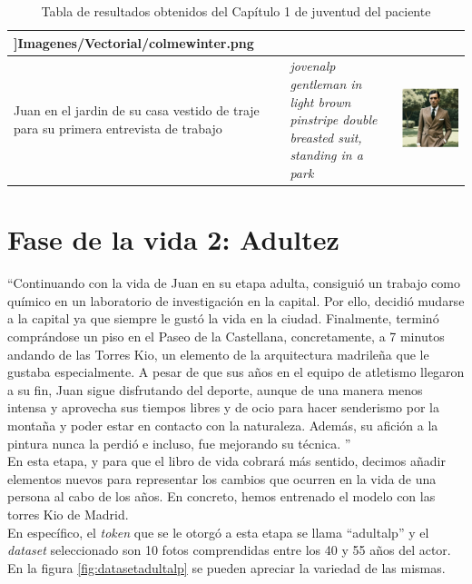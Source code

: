 \begin{table}
\begin{tabular}{>{\centering\arraybackslash}m{5cm} >{\arraybackslash}m{5cm}>{\arraybackslash}m{5cm}}
 		\textwidth]{Imagenes/Vectorial/colmewinter.png}\\
 		\hline
 		Juan en el jardin de su casa vestido de traje para su primera entrevista de trabajo & \textit{jovenalp gentleman in light brown pinstripe double breasted suit, standing in a park} & \includegraphics[width = 0.3
 		\textwidth]{Imagenes/Vectorial/jovenalptraje.png}\\
 		\hline
 	\end{tabular}
 	\caption{Tabla de resultados obtenidos del Capítulo 1 de juventud del paciente}
 	\label{tab:capitulo1librovida}
 \end{table}


\section{Fase de la vida 2: Adultez}
``Continuando con la vida de Juan en su etapa adulta, consiguió un trabajo como químico en un laboratorio de investigación en la capital. Por ello, decidió mudarse a la capital ya que siempre le gustó la vida en la ciudad. Finalmente, terminó comprándose un piso en el Paseo de la Castellana, concretamente, a 7 minutos andando de las Torres Kio, un elemento de la arquitectura madrileña que le gustaba especialmente. A pesar de que sus años en el equipo de atletismo llegaron a su fin, Juan sigue disfrutando del deporte, aunque de una manera menos intensa y aprovecha sus tiempos libres y de ocio para hacer senderismo por la montaña y poder estar en contacto con la naturaleza. Además, su afición a la pintura nunca la perdió e incluso, fue mejorando su técnica. '' \\

En esta etapa, y para que el libro de vida cobrará más sentido, decimos añadir elementos nuevos para representar los cambios que ocurren en la vida de una persona al cabo de los años. En concreto, hemos entrenado el modelo con las torres Kio de Madrid.\\

En específico, el \textit{token} que se le otorgó a esta etapa se llama ``adultalp'' y el \textit{dataset} seleccionado son 10 fotos comprendidas entre los 40 y 55 años del actor. En la figura \ref{fig:datasetadultalp} se pueden apreciar la variedad de las mismas. \\


